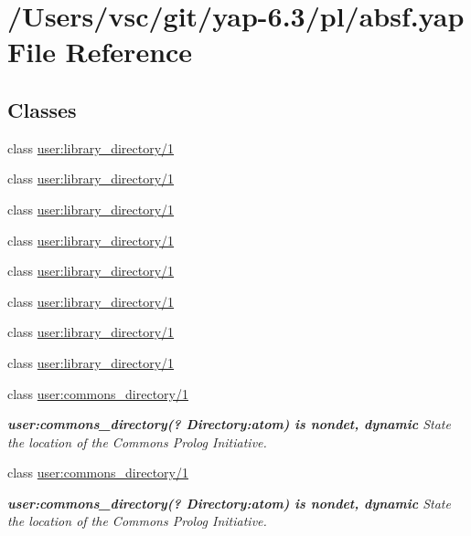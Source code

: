 \hypertarget{absf_8yap}{}\section{/\+Users/vsc/git/yap-\/6.3/pl/absf.yap File Reference}
\label{absf_8yap}
\subsection*{Classes}
\begin{DoxyCompactItemize}
\item 
class \hyperlink{classuser_1_1library__directory_21}{user\+:library\+\_\+directory/1}
\item 
class \hyperlink{classuser_1_1library__directory_21}{user\+:library\+\_\+directory/1}
\item 
class \hyperlink{classuser_1_1library__directory_21}{user\+:library\+\_\+directory/1}
\item 
class \hyperlink{classuser_1_1library__directory_21}{user\+:library\+\_\+directory/1}
\item 
class \hyperlink{classuser_1_1library__directory_21}{user\+:library\+\_\+directory/1}
\item 
class \hyperlink{classuser_1_1library__directory_21}{user\+:library\+\_\+directory/1}
\item 
class \hyperlink{classuser_1_1library__directory_21}{user\+:library\+\_\+directory/1}
\item 
class \hyperlink{classuser_1_1library__directory_21}{user\+:library\+\_\+directory/1}
\item 
class \hyperlink{classuser_1_1commons__directory_21}{user\+:commons\+\_\+directory/1}
\begin{DoxyCompactList}\small\item\em {\bfseries  user\+:commons\+\_\+directory(? {\itshape Directory}\+:atom) is nondet, dynamic } State the location of the Commons Prolog Initiative. \end{DoxyCompactList}\item 
class \hyperlink{classuser_1_1commons__directory_21}{user\+:commons\+\_\+directory/1}
\begin{DoxyCompactList}\small\item\em {\bfseries  user\+:commons\+\_\+directory(? {\itshape Directory}\+:atom) is nondet, dynamic } State the location of the Commons Prolog Initiative. \end{DoxyCompactList}\item 

\end{DoxyCompactItemize}
